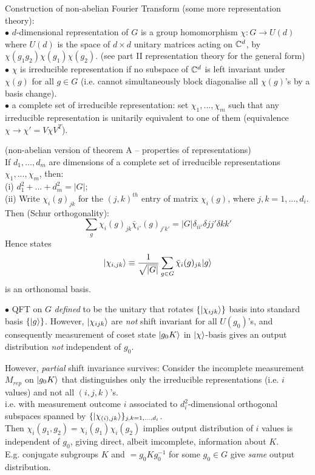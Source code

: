 \documentclass[a4paper]{article}
\begin{document}
Construction of non-abelian Fourier Transform (some more representation theory):\\
$\bullet$ $d$-dimensional representation of $G$ is a group homomorphism $\chi: G \to U(d)$ where $U(d)$ is the space of $d \times d$ unitary matrices acting on $\mathbb{C}^d$, by $\chi(g_1 g_2) \chi(g_1)\chi(g_2)$. (see part II representation theory for the general form)\\
$\bullet$ $\chi$ is irreducible representation if no subspace of $\mathbb{C}^d$ is left invariant under $\chi(g)$ for all $g \in G$ (i.e. cannot simultaneously block diagonalise all $\chi(g)$'s by a basis change).\\
$\bullet$ a complete set of irreducible representation: set $\chi_1,...,\chi_m$ such that any irreducible representation is unitarily equivalent to one of them (equivalence $\chi \to \chi' = V\chi V^T$).

\begin{thm} (non-abelian version of theorem A -- properties of representations)\\
    If $d_1,...,d_m$ are dimensions of a complete set of irreducible representations $\chi_1,...,\chi_m$, then:\\
    (i) $d_1^2+...+d_m^2 = |G|$;\\
    (ii) Write $\chi_i(g)_{jk}$ for the $(j,k)^{th}$ entry of matrix $\chi_i(g)$, where $j,k = 1,...,d_i$. Then (Schur orthogonality):
    $$\sum_g \chi_i(g)_{jk} \bar{\chi}_{i'}(g)_{j'k'} = |G| \delta_{ii'} \delta{jj'}\delta{kk'}$$
    Hence states
    $$|\chi_{i,jk} \rangle \equiv \frac{1}{\sqrt{|G|}} \sum_{g \in G} \bar{\chi}_i(g)_{jk} |g\rangle$$
    is an orthonomal basis.
\end{thm}

$\bullet$ QFT on $G$ \emph{defined} to be the unitary that rotates $\{|\chi_{ijk}\rangle\}$ basis into standard basis $\{|g\rangle\}$. However, $|\chi_{ijk}\rangle$ are \emph{not} shift invariant for all $U(g_0)$'s, and consequently measurement of coset state $|g_0 K\rangle$ in $|\chi \rangle$-basis gives an output distribution \emph{not} independent of $g_0$.

However, \emph{partial} shift invariance survives: Consider the incomplete measurement $M_{rep}$ on $|g_0 K\rangle$ that distinguishes only the irreducible representations (i.e. $i$ values) and not all $(i,j,k)$'s.\\
i.e. with measurement outcome $i$ associated to $d_i^2$-dimensional orthogonal subspaces spanned by $\{|\chi_{(i),jk}\rangle\}_{j,k = 1,...,d_i}$.\\
Then $\chi_i(g_1,g_2) = \chi_i(g_1) \chi_i(g_2)$ implies output distribution of $i$ values is independent of $g_0$, giving direct, albeit imcomplete, information about $K$.\\
E.g. conjugate subgroups $K$ and $ = g_0 K g_0^{-1}$ for some $g_0 \in G$ give \emph{same} output distribution.
\end{document}
